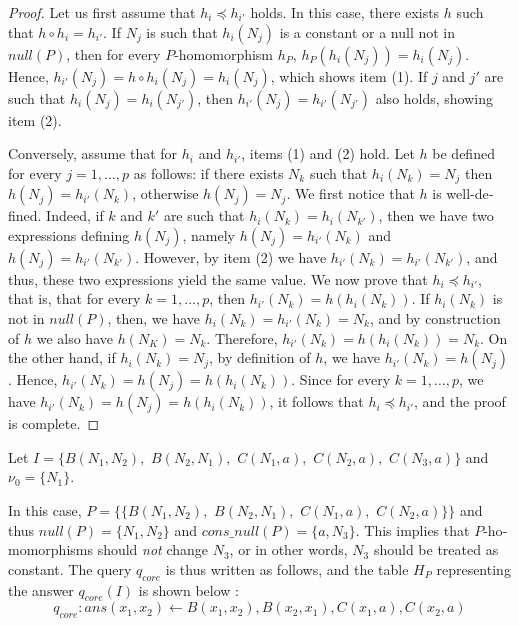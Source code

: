 \begin{otherlanguage}{english}
\begin{proof}
    Let us first assume that $h_i \preceq h_{i'}$ holds.
    In this case, there exists $h$ such that $h \circ h_{i} = h_{i'}$.
    If $N_j$ is such that $h_i(N_j)$ is a constant or a null not in $null(P)$, then for every $P$-homomorphism $h_P$, $h_P(h_{i}(N_j))= h_{i}(N_j)$.
    Hence, $h_{i'}(N_j)= h \circ h_{i}(N_j) = h_{i}(N_j)$, which shows item (1).
    If $j$ and $j'$ are such that $h_i(N_j)= h_i(N_{j'})$, then $h_{i'}(N_j)= h_{i'}(N_{j'})$ also holds, showing item (2).

    Conversely, assume that for $h_i$ and $h_{i'}$, items (1) and (2) hold.
    Let $h$ be defined for every $j = 1, \ldots, p$ as follows: if there exists $N_k$ such that $h_i(N_k)=N_j$ then $h(N_j) = h_{i'}(N_k)$, otherwise $h(N_j)=N_j$.
    We first notice that $h$ is well-defined.
    Indeed, if $k$ and $k'$ are such that $h_i(N_k)=h_i(N_{k'})$, then we have two expressions defining $h(N_j)$, namely $h(N_j) = h_{i'}(N_k)$ and $h(N_j) = h_{i'}(N_{k'})$.
    However, by item (2) we have $h_{i'}(N_k)=h_{i'}(N_{k'})$, and thus, these two expressions yield the same value.
    We now prove that $h_{i} \preceq h_{i'}$, that is, that for every $k = 1, \ldots, p$, then $h_{i'}(N_k)=h(h_{i}(N_k))$.
    If $h_i(N_k)$ is not in $null(P)$, then, we have $h_i(N_k)=h_{i'}(N_k)=N_k$, and by construction of $h$ we also have $h(N_K)=N_k$.
    Therefore, $h_{i'}(N_k)=h(h_{i}(N_k))=N_k$.
    On the other hand, if $h_i(N_k)=N_j$, by definition of $h$, we have $h_{i'}(N_k)=h(N_j)$.
    Hence, $h_{i'}(N_k)=h(N_j)=h(h_i(N_k))$.
    Since for every $k = 1, \ldots, p$, we have $h_{i'}(N_k)=h(N_j)=h(h_i(N_k))$, it follows that $h_i \preceq h_{i'}$, and the proof is complete.
\end{proof}

\begin{example}\label{ex:most-spec}
    {\rm
        Let $I=\{B(N_1,N_2),$ $B(N_2,N_1),$ $C(N_1,a),$ $C(N_2,a),$ $C(N_3,a)\}$ and $\nu_0=\{N_1\}$.

        In this case, $P=\{\{B(N_1,N_2),$ $B(N_2,N_1),$ $C(N_1,a),$ $C(N_2,a)\}\}$ and thus $null(P)=\{N_1, N_2\}$ and $cons\_null(P)=\{a, N_3\}$.
        This implies that $P$-homomorphisms should \emph{not} change $N_3$, or in other words, $N_3$ should be treated as constant.
        The query $q_{core}$ is thus written as follows, and the table $H_P$ representing the answer $q_{core}(I)$ is shown below :
        \[
            q_{core}: ans(x_1,x_2) \leftarrow B(x_1,x_2), B(x_2,x_1), C(x_1,a), C(x_2,a)
        \]

}
\end{example}
\end{otherlanguage}
